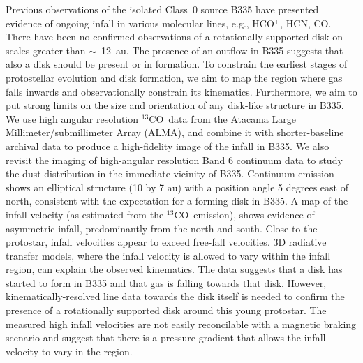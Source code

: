 \documentclass{aa}
\newcommand{\about}{$\sim$}                       %
\newcommand{\trettenco}{$^{13}$CO\xspace}
\begin{document}
  \abstract
  {Previous observations of the isolated Class~0 source B335 have presented evidence of ongoing infall in various molecular lines, e.g., HCO$^+$, HCN, CO. There have been no confirmed observations of a rotationally supported disk on scales greater than \about~12~au.}
  {The presence of an outflow in B335 suggests that also a disk should be present or in formation. To constrain the earliest stages of protostellar evolution and disk formation, we aim to map the region where gas falls inwards and observationally constrain its kinematics. Furthermore, we aim to put strong limits on the size and orientation of any disk-like structure in B335.}
  {We use high angular resolution \trettenco\ data from the Atacama Large Millimeter/submillimeter Array (ALMA), and combine it with shorter-baseline archival data to produce a high-fidelity image of the infall in B335. We also revisit the imaging of high-angular resolution Band 6 continuum data to study the dust distribution in the immediate vicinity of B335. }
  {Continuum emission shows an elliptical structure (10 by 7 au) with a position angle 5 degrees east of north, consistent with the expectation for a forming disk in B335. A map of the infall velocity (as estimated from the \trettenco\ emission), shows evidence of asymmetric infall, predominantly from the north and south. Close to the protostar, infall velocities appear to exceed free-fall velocities. 3D radiative transfer models, where the infall velocity is allowed to vary within the infall region, can explain the observed kinematics.}
  {The data suggests that a disk has started to form in B335 and that gas is falling towards that disk. However, kinematically-resolved line data towards the disk itself is needed to confirm the presence of a rotationally supported disk around this young protostar. The measured high infall velocities are not easily reconcilable with a magnetic braking scenario and suggest that there is a pressure gradient that allows the infall velocity to vary in the region. }

\maketitle  
\end{document}
